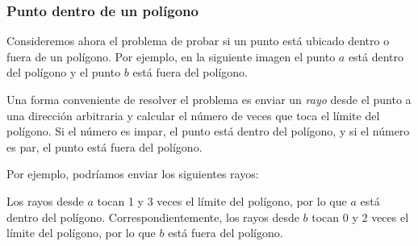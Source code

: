 \subsubsection{Punto dentro de un polígono}

Consideremos ahora el problema de
probar si un punto está ubicado dentro o fuera
de un polígono.
Por ejemplo, en la siguiente imagen el punto $a$
está dentro del polígono y el punto $b$ está fuera
del polígono.

\begin{center}
\end{center}

Una forma conveniente de resolver el problema es
enviar un \emph{rayo} desde el punto a una dirección arbitraria
y calcular el número de veces que toca
el límite del polígono.
Si el número es impar,
el punto está dentro del polígono,
y si el número es par,
el punto está fuera del polígono.

\begin{samepage}
Por ejemplo, podríamos enviar los siguientes rayos:
\begin{center}
\end{center}
\end{samepage}


Los rayos desde $a$ tocan 1 y 3 veces
el límite del polígono,
por lo que $a$ está dentro del polígono.
Correspondientemente, los rayos desde $b$
tocan 0 y 2 veces el límite del polígono,
por lo que $b$ está fuera del polígono.

